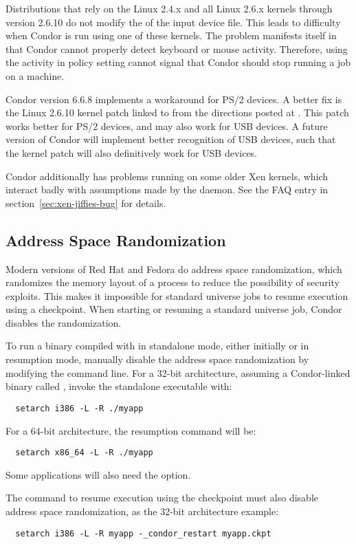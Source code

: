 Distributions that rely on the Linux 2.4.x and all Linux 2.6.x kernels
through version 2.6.10
do not modify the  of the input device file.
This leads to difficulty when Condor is run using one of these
kernels. 
The problem manifests itself in that Condor cannot properly
detect keyboard or mouse activity.
Therefore, using the activity in policy setting cannot
signal that Condor should stop running a job on a machine.

Condor version 6.6.8 implements a workaround for PS/2 devices.
A better fix is the Linux 2.6.10 kernel
patch linked to from the directions posted at
.
This patch works better for PS/2 devices, and
may also work for USB devices.
A future version of Condor will implement better recognition
of USB devices,
such that the kernel patch will also definitively work for USB devices.

Condor additionally has problems running on some older Xen kernels,
which interact badly with assumptions made by the 
daemon. See the FAQ entry in section~\ref{sec:xen-jiffies-bug} for
details.

\subsection{\label{sec:platform-linux-addrspace-random}Address Space Randomization}

Modern versions of Red Hat and Fedora do address space randomization,
which randomizes the memory layout of a process
to reduce the possibility of security exploits. 
This makes it impossible
for standard universe jobs to resume execution using a checkpoint.
When starting or resuming a standard universe job,
Condor disables the randomization.

To run a binary compiled with   in standalone mode,
either initially or in resumption mode,
manually disable the address space randomization by modifying the
command line.
For a 32-bit architecture, assuming a
Condor-linked binary called ,
invoke the standalone executable with:
\begin{verbatim}
  setarch i386 -L -R ./myapp
\end{verbatim}
For a 64-bit architecture, the resumption command will be: 
\begin{verbatim}
  setarch x86_64 -L -R ./myapp
\end{verbatim}
Some applications will also need the  option.

The command to resume execution using the checkpoint must also
disable address space randomization, 
as the 32-bit architecture example:
\begin{verbatim}
  setarch i386 -L -R myapp -_condor_restart myapp.ckpt
\end{verbatim}


